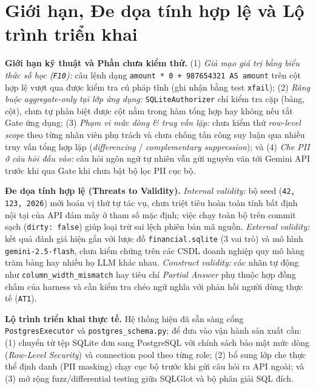 \section{Giới hạn, Đe dọa tính hợp lệ và Lộ trình triển khai}
\label{sec:limitations}

\noindent \textbf{Giới hạn kỹ thuật và Phần chưa kiểm thử.} (1) \textit{Giả mạo giá trị bằng biểu thức số học (\texttt{F10}):} câu lệnh dạng \texttt{amount * 0 + 987654321 AS amount} trên cột hợp lệ vượt qua được kiểm tra cú pháp tĩnh (ghi nhận bằng test \texttt{xfail}); (2) \textit{Ràng buộc aggregate-only tại lớp ứng dụng:} \texttt{SQLiteAuthorizer} chỉ kiểm tra cặp (bảng, cột), chưa tự phân biệt được cột nằm trong hàm tổng hợp hay không nếu tắt Gate ứng dụng; (3) \textit{Phạm vi mức dòng \& truy vấn lặp:} chưa kiểm thử \textit{row-level scope} theo từng nhân viên phụ trách và chưa chống tấn công suy luận qua nhiều truy vấn tổng hợp lặp (\textit{differencing} / \textit{complementary suppression}); và (4) \textit{Che PII ở câu hỏi đầu vào:} câu hỏi ngôn ngữ tự nhiên vẫn gửi nguyên văn tới Gemini API trước khi qua Gate khi chưa bật bộ lọc PII cục bộ.

\noindent \textbf{Đe dọa tính hợp lệ (Threats to Validity).} \textit{Internal validity:} bộ seed (\texttt{42, 123, 2026}) mới hoán vị thứ tự tác vụ, chưa triệt tiêu hoàn toàn tính bất định nội tại của API đám mây ở tham số mặc định; việc chạy toàn bộ trên commit sạch (\texttt{dirty: false}) giúp loại trừ sai lệch phiên bản mã nguồn. \textit{External validity:} kết quả đánh giá hiện gắn với lược đồ \texttt{financial.sqlite} (3 vai trò) và mô hình \texttt{gemini-2.5-flash}, chưa kiểm chứng trên các CSDL doanh nghiệp quy mô hàng trăm bảng hay nhiều họ LLM khác nhau. \textit{Construct validity:} các nhãn tự động như \texttt{column\_width\_mismatch} hay tiêu chí \textit{Partial Answer} phụ thuộc hợp đồng chấm của harness và cần kiểm tra chéo ngữ nghĩa với phản hồi người dùng thực tế (\texttt{AT1}).

\noindent \textbf{Lộ trình triển khai thực tế.} Hệ thống hiện đã sẵn sàng cổng \texttt{PostgresExecutor} và \texttt{postgres\_schema.py}; để đưa vào vận hành sản xuất cần: (1) chuyển từ tệp SQLite đơn sang PostgreSQL với chính sách bảo mật mức dòng (\textit{Row-Level Security}) và connection pool theo từng role; (2) bổ sung lớp che thực thể định danh (PII masking) chạy cục bộ trước khi gửi câu hỏi ra API ngoài; và (3) mở rộng fuzz/differential testing giữa SQLGlot và bộ phân giải SQL đích.
